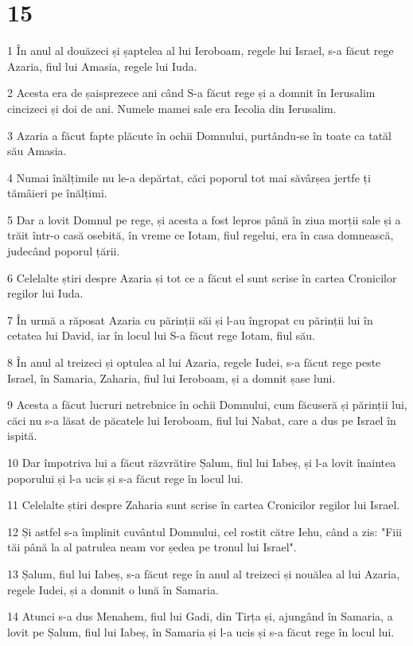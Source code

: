 \chapter{15}

\par 1 În anul al douăzeci și șaptelea al lui Ieroboam, regele lui Israel, s-a făcut rege Azaria, fiul lui Amasia, regele lui Iuda.
\par 2 Acesta era de șaisprezece ani când S-a făcut rege și a domnit în Ierusalim cincizeci și doi de ani. Numele mamei sale era Iecolia din Ierusalim.
\par 3 Azaria a făcut fapte plăcute în ochii Domnului, purtându-se în toate ca tatăl său Amasia.
\par 4 Numai înălțimile nu le-a depărtat, căci poporul tot mai săvârșea jertfe ți tămâieri pe înălțimi.
\par 5 Dar a lovit Domnul pe rege, și acesta a fost lepros până în ziua morții sale și a trăit într-o casă osebită, în vreme ce Iotam, fiul regelui, era în casa domnească, judecând poporul țării.
\par 6 Celelalte știri despre Azaria și tot ce a făcut el sunt scrise în cartea Cronicilor regilor lui Iuda.
\par 7 În urmă a răposat Azaria cu părinții săi și l-au îngropat cu părinții lui în cetatea lui David, iar în locul lui S-a făcut rege Iotam, fiul său.
\par 8 În anul al treizeci și optulea al lui Azaria, regele Iudei, s-a făcut rege peste Israel, în Samaria, Zaharia, fiul lui Ieroboam, și a domnit șase luni.
\par 9 Acesta a făcut lucruri netrebnice în ochii Domnului, cum făcuseră și părinții lui, căci nu s-a lăsat de păcatele lui Ieroboam, fiul lui Nabat, care a dus pe Israel în ispită.
\par 10 Dar împotriva lui a făcut răzvrătire Șalum, fiul lui Iabeș, și l-a lovit înaintea poporului și l-a ucis și s-a făcut rege în locul lui.
\par 11 Celelalte știri despre Zaharia sunt scrise în cartea Cronicilor regilor lui Israel.
\par 12 Și astfel s-a împlinit cuvântul Domnului, cel rostit către Iehu, când a zis: "Fiii tăi până la al patrulea neam vor ședea pe tronul lui Israel".
\par 13 Șalum, fiul lui Iabeș, s-a făcut rege în anul al treizeci și nouălea al lui Azaria, regele Iudei, și a domnit o lună în Samaria.
\par 14 Atunci s-a dus Menahem, fiul lui Gadi, din Tirța și, ajungând în Samaria, a lovit pe Șalum, fiul lui Iabeș, în Samaria și l-a ucis și s-a făcut rege în locul lui.
